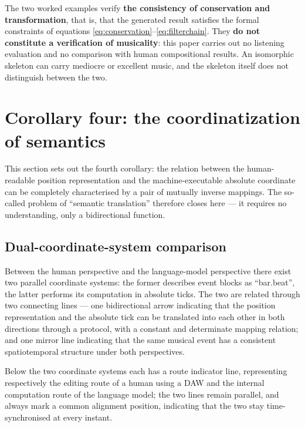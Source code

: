 \documentclass[11pt,a4paper]{article}
\begin{document}
\begin{remark}
The two worked examples verify \textbf{the consistency of conservation and
transformation}, that is, that the generated result satisfies the formal constraints of
equations \eqref{eq:conservation}--\eqref{eq:filterchain}. They \textbf{do not
constitute a verification of musicality}: this paper carries out no listening
evaluation and no comparison with human compositional results. An isomorphic skeleton
can carry mediocre or excellent music, and the skeleton itself does not distinguish
between the two.
\end{remark}

\section{Corollary four: the coordinatization of semantics}
\label{sec:semantic}

This section sets out the fourth corollary: the relation between the human-readable
position representation and the machine-executable absolute coordinate can be
completely characterised by a pair of mutually inverse mappings. The so-called problem
of ``semantic translation'' therefore closes here --- it requires no understanding, only
a bidirectional function.
\subsection{Dual-coordinate-system comparison}

Between the human perspective and the language-model perspective there exist two
parallel coordinate systems: the former describes event blocks as ``bar.beat'', the
latter performs its computation in absolute ticks. The two are related through two
connecting lines --- one bidirectional arrow indicating that the position representation
and the absolute tick can be translated into each other in both directions through a
protocol, with a constant and determinate mapping relation; and one mirror line
indicating that the same musical event has a consistent spatiotemporal structure under
both perspectives.

Below the two coordinate systems each has a route indicator line, representing
respectively the editing route of a human using a DAW and the internal computation route
of the language model; the two lines remain parallel, and always mark a common alignment
position, indicating that the two stay time-synchronised at every instant.
\end{document}
